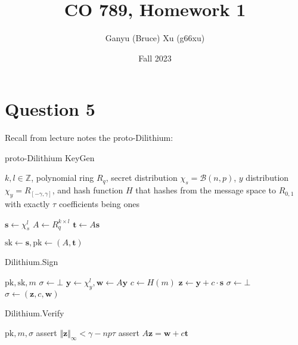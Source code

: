 \documentclass{article}
\title{CO 789, Homework 1}
\author{Ganyu (Bruce) Xu (g66xu)}
\date{Fall 2023}
\newcommand{\norm}[1]{\Vert {#1} \Vert}
\begin{document}

\section*{Question 5}
Recall from lecture notes the proto-Dilithium:

\begin{algorithm}
\caption{proto-Dilithium KeyGen}
\begin{algorithmic}[1]
    \Require $k, l \in \mathbb{Z}$, polynomial ring $R_q$, secret distribution $\chi_s = \mathcal{B}(n, p)$, $y$ distribution $\chi_y = R_{[-\gamma, \gamma]}$, and hash function $H$ that hashes from the message space to $R_{0,1}$ with exactly $\tau$ coefficients being ones

    \State $\mathbf{s} \leftarrow \chi_s^l$
    \State $A \leftarrow R_q^{k \times l}$
    \State $\mathbf{t} \leftarrow A\mathbf{s}$

    \Return $\text{sk} \leftarrow \mathbf{s}, \text{pk} \leftarrow (A, \mathbf{t})$
\end{algorithmic}
\end{algorithm}

\begin{algorithm}
    \caption{Dilithium.Sign}
    \begin{algorithmic}[1]
        \Require $\text{pk}, \text{sk}, m$
        \State $\sigma \leftarrow \bot$
        \While{$\sigma = \bot$}
            \State $\mathbf{y} \leftarrow \chi_y^l, \mathbf{w} \leftarrow A\mathbf{y}$
            \State $c \leftarrow H(m)$
            \State $\mathbf{z} \leftarrow \mathbf{y} + c \cdot \mathbf{s}$
            \If{$\norm{\mathbf{z}}_\infty \geq \gamma - np\tau$}
                \State $\sigma \leftarrow \bot$
            \Else
                \State $\sigma \leftarrow (\mathbf{z}, c, \mathbf{w})$
            \EndIf
        \EndWhile
    \end{algorithmic}
\end{algorithm}

\begin{algorithm}
    \caption{Dilithium.Verify}
    \begin{algorithmic}[1]
        \Require $\text{pk}, m, \sigma$
        \State assert $\norm{\mathbf{z}}_\infty < \gamma - np\tau$
        \State assert $A\mathbf{z} = \mathbf{w} + c \mathbf{t}$ 
    \end{algorithmic}
\end{algorithm}
\end{document}
